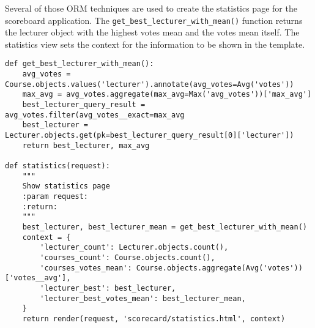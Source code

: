 Several of those ORM techniques are used to create the statistics page for the scoreboard application. The \lstinline|get_best_lecturer_with_mean()| function returns the lecturer object with the highest votes mean and the votes mean itself. The statistics view sets the context for the information to be shown in the template.
\begin{lstlisting}[style=Python, caption=Statistics view, label=lst:statistics_view]
def get_best_lecturer_with_mean():
    avg_votes = Course.objects.values('lecturer').annotate(avg_votes=Avg('votes'))
    max_avg = avg_votes.aggregate(max_avg=Max('avg_votes'))['max_avg']
    best_lecturer_query_result = avg_votes.filter(avg_votes__exact=max_avg
    best_lecturer = Lecturer.objects.get(pk=best_lecturer_query_result[0]['lecturer'])
    return best_lecturer, max_avg
    
def statistics(request):
    """
    Show statistics page
    :param request:
    :return:
    """
    best_lecturer, best_lecturer_mean = get_best_lecturer_with_mean()
    context = {
        'lecturer_count': Lecturer.objects.count(),
        'courses_count': Course.objects.count(),
        'courses_votes_mean': Course.objects.aggregate(Avg('votes'))['votes__avg'],
        'lecturer_best': best_lecturer,
        'lecturer_best_votes_mean': best_lecturer_mean,
    }
    return render(request, 'scorecard/statistics.html', context)
\end{lstlisting}